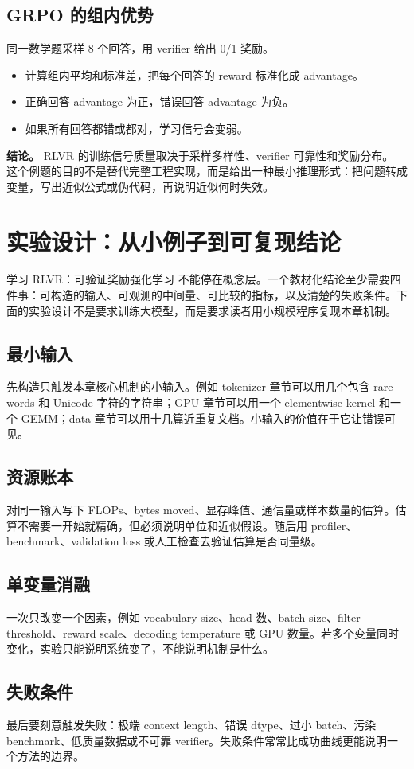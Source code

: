 \documentclass[a4paper]{article}
\begin{document}
\subsection{GRPO 的组内优势}
同一数学题采样 8 个回答，用 verifier 给出 0/1 奖励。
\begin{itemize}
\item 计算组内平均和标准差，把每个回答的 reward 标准化成 advantage。
\item 正确回答 advantage 为正，错误回答 advantage 为负。
\item 如果所有回答都错或都对，学习信号会变弱。
\end{itemize}
\textbf{结论。} RLVR 的训练信号质量取决于采样多样性、verifier 可靠性和奖励分布。
这个例题的目的不是替代完整工程实现，而是给出一种最小推理形式：把问题转成变量，写出近似公式或伪代码，再说明近似何时失效。
\section{实验设计：从小例子到可复现结论}
学习 RLVR：可验证奖励强化学习 不能停在概念层。一个教材化结论至少需要四件事：可构造的输入、可观测的中间量、可比较的指标，以及清楚的失败条件。下面的实验设计不是要求训练大模型，而是要求读者用小规模程序复现本章机制。
\subsection{最小输入}
先构造只触发本章核心机制的小输入。例如 tokenizer 章节可以用几个包含 rare words 和 Unicode 字符的字符串；GPU 章节可以用一个 elementwise kernel 和一个 GEMM；data 章节可以用十几篇近重复文档。小输入的价值在于它让错误可见。
\subsection{资源账本}
对同一输入写下 FLOPs、bytes moved、显存峰值、通信量或样本数量的估算。估算不需要一开始就精确，但必须说明单位和近似假设。随后用 profiler、benchmark、validation loss 或人工检查去验证估算是否同量级。
\subsection{单变量消融}
一次只改变一个因素，例如 vocabulary size、head 数、batch size、filter threshold、reward scale、decoding temperature 或 GPU 数量。若多个变量同时变化，实验只能说明系统变了，不能说明机制是什么。
\subsection{失败条件}
最后要刻意触发失败：极端 context length、错误 dtype、过小 batch、污染 benchmark、低质量数据或不可靠 verifier。失败条件常常比成功曲线更能说明一个方法的边界。
\end{document}
